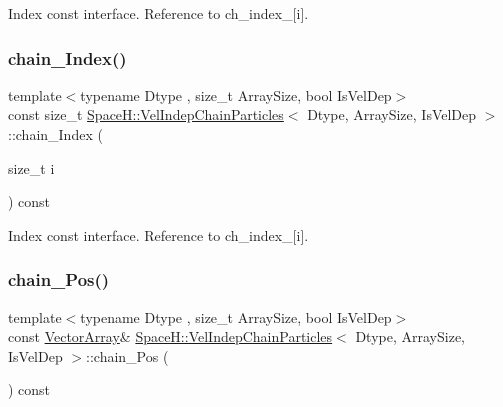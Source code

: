 Index const interface. Reference to ch\+\_\+index\+\_\+\mbox{[}i\mbox{]}. 

\mbox{\label{class_space_h_1_1_vel_indep_chain_particles_a99486efb9a38d5b097bcb35d46204dfd}} 
\subsubsection{\texorpdfstring{chain_\+Index()}{chainIndex()}\hspace{0.1cm}{\footnotesize\ttfamily [4/4]}}
{\footnotesize\ttfamily template$<$typename Dtype , size\+\_\+t Array\+Size, bool Is\+Vel\+Dep$>$ \\
const size\+\_\+t \mbox{\hyperlink{class_space_h_1_1_vel_indep_chain_particles}{Space\+H\+::\+Vel\+Indep\+Chain\+Particles}}$<$ Dtype, Array\+Size, Is\+Vel\+Dep $>$\+::chain_\+Index (\begin{DoxyParamCaption}\item[{size\+\_\+t}]{i }\end{DoxyParamCaption}) const\hspace{0.3cm}{\ttfamily [inline]}}



Index const interface. Reference to ch\+\_\+index\+\_\+\mbox{[}i\mbox{]}. 

\mbox{\label{class_space_h_1_1_vel_indep_chain_particles_a2dd7d2f703141d0ef3d8728b2a57cb83}} 
\subsubsection{\texorpdfstring{chain_\+Pos()}{chainPos()}\hspace{0.1cm}{\footnotesize\ttfamily [1/4]}}
{\footnotesize\ttfamily template$<$typename Dtype , size\+\_\+t Array\+Size, bool Is\+Vel\+Dep$>$ \\
const \mbox{\hyperlink{class_space_h_1_1_vel_indep_particles_aa9983058940249df8b00fa800e8cbad2}{Vector\+Array}}\& \mbox{\hyperlink{class_space_h_1_1_vel_indep_chain_particles}{Space\+H\+::\+Vel\+Indep\+Chain\+Particles}}$<$ Dtype, Array\+Size, Is\+Vel\+Dep $>$\+::chain_\+Pos (\begin{DoxyParamCaption}{ }\end{DoxyParamCaption}) const\hspace{0.3cm}{\ttfamily [inline]}}



